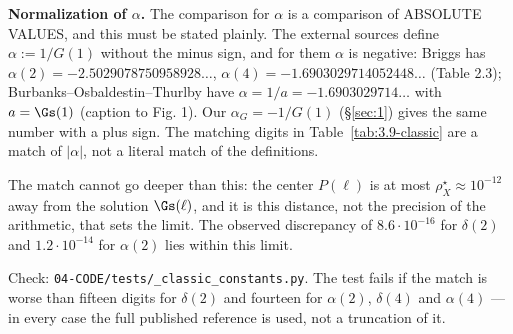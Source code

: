 \textbf{Normalization of $\alpha$.} The comparison for $\alpha$ is a comparison of ABSOLUTE VALUES, and this must be stated plainly. The external sources define $\alpha := 1/G(1)$ without the minus sign, and for them $\alpha$ is negative: Briggs has $\alpha(2) = -2.5029078750958928\ldots$, $\alpha(4) = -1.6903029714052448\ldots$ (Table 2.3); Burbanks--Osbaldestin--Thurlby have $\alpha = 1/a = -1.6903029714\ldots$ with $a = \Gs(1)$ (caption to Fig. 1). Our $\alpha_{G} = -1/G(1)$ (\S\ref{sec:1}) gives the same number with a plus sign. The matching digits in Table~\ref{tab:3.9-classic} are a match of $|\alpha|$, not a literal match of the definitions.

The match cannot go deeper than this: the center $P(\ell)$ is at most $\rho^{\star}_{X} \approx 10^{-12}$ away from the solution $\Gs(\ell)$, and it is this distance, not the precision of the arithmetic, that sets the limit. The observed discrepancy of $8.6\cdot 10^{-16}$ for $\delta(2)$ and $1.2\cdot 10^{-14}$ for $\alpha(2)$ lies within this limit.

Check: \texttt{04-\allowbreak CODE/\allowbreak tests/\allowbreak \_\allowbreak classic\_\allowbreak constants.py}. The test fails if the match is worse than fifteen digits for $\delta(2)$ and fourteen for $\alpha(2)$, $\delta(4)$ and $\alpha(4)$ --- in every case the full published reference is used, not a truncation of it.

